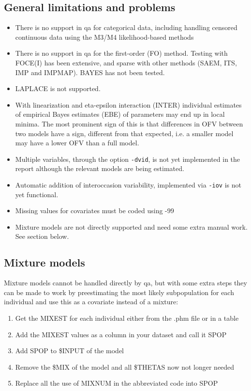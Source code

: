 \subsection{General limitations and problems}
\begin{itemize}
	\item There is no support in qa for categorical data, including handling censored continuous data using the M3/M4 likelihood-based methods
	\item There is no support in qa for the first-order (FO) method. Testing with FOCE(I) has been extensive, and sparse with other methods (SAEM, ITS, IMP and IMPMAP). BAYES has not been tested. 
    \item LAPLACE is not supported.
	\item With linearization and eta-epsilon interaction (INTER) individual estimates of empirical Bayes estimates (EBE) of parameters may end up in local minima. The most prominent sign of this is that differences in OFV between two models have a sign, different from that expected, i.e. a smaller model may have a lower OFV than a full model.
	\item Multiple variables, through the option \verb|-dvid|, is not yet implemented in the report although the relevant models are being estimated.
	\item Automatic addition of interoccasion variability, implemented via \verb|-iov| is not yet functional.
    \item Missing values for covariates must be coded using -99
    \item Mixture models are not directly supported and need some extra manual work. See section below.
\end{itemize}

\subsection{Mixture models}
Mixture models cannot be handled directly by qa, but with some extra steps they can be made to work by preestimating the most likely subpopulation for each individual and use this as a covariate instead of a mixture:
\begin{enumerate}
    \item Get the MIXEST for each individual either from the .phm file or in a table
    \item Add the MIXEST values as a column in your dataset and call it SPOP
    \item Add SPOP to \$INPUT of the model
    \item Remove the \$MIX of the model and all \$THETAS now not longer needed
    \item Replace all the use of MIXNUM in the abbreviated code into SPOP
\end{enumerate}


